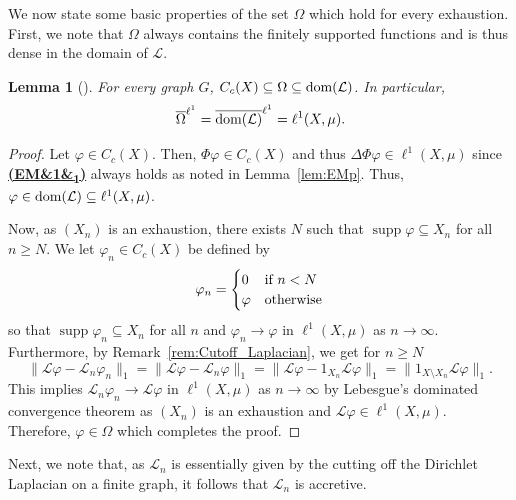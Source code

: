 \documentclass[letterpaper]{article}
\newtheorem{lemma}{Lemma}[section]
\theoremstyle{definition}
\theoremstyle{named}
\numberwithin{equation}{section}
\newcommand{\EM}[1][]{\hyperlink{ass:EM}{\textup{\textbf{(EM\ifx&#1&\else\textsubscript{#1}\fi)}}}}
\newcommand{\dom}{\textnormal{dom}} %
\newcommand{\Deltaphi}{\mathcal{L}}
\newcommand{\Lmin}{\mathcal{L}_{n}}
\begin{document}
We now state some basic properties of the set $\Omega$ which hold for every exhaustion.
First, we note that $\Omega$ always contains the finitely supported functions
and is thus dense in the domain of $\Deltaphi$.
\begin{lemma}[{\cite[Lemma~B.7]{bianchi2022generalized}}]\label{l:omega_denseness}
    For every graph $G$, $C_c(X) \subseteq \Omega \subseteq \dom(\Deltaphi)$. In particular, 
    $$\overline{\Omega}^{\ell^1} = \overline{\dom(\Deltaphi)}^{\ell^1} = \ell^1(X,\mu).$$
\end{lemma}
\begin{proof}
    Let $\varphi \in C_c(X)$. Then, $\Phi \varphi \in C_c(X)$ and thus 
    $\Delta \Phi\varphi \in \ell^1(X,\mu)$ since \EM[1] always holds as noted in
    Lemma~\ref{lem:EMp}. Thus, $\varphi \in \dom(\Deltaphi) \subseteq \ell^1(X,\mu)$.
    
    Now, as $(X_n)$ is an exhaustion, there exists $N$ such that
    $\operatorname{supp}\varphi \subseteq X_n$ for all $n \geq N$. We let $\varphi_n \in C_c(X)$
    be defined by 
    $$ \varphi_n = \begin{cases}
        0 & \textup{if } n < N \\
        \varphi & \textup{otherwise} 
    \end{cases}
    $$
    so that $\operatorname{supp}\varphi_n \subseteq X_n$ for all $n$ and $\varphi_n \to \varphi$
    in $\ell^1(X,\mu)$ as $n \to \infty$. 
    Furthermore, by Remark~\ref{rem:Cutoff_Laplacian}, we get for $n \geq N$
    $$\|\Deltaphi \varphi -\Deltaphi_n \varphi_n\|_1 = \|\Deltaphi \varphi -\Deltaphi_n \varphi\|_1 =
    \| \Deltaphi \varphi - 1_{X_n} \Deltaphi \varphi \|_1 = \|1_{X \setminus X_n} \Deltaphi \varphi\|_1.
    $$
    This implies $\Deltaphi_n \varphi_n \to \Deltaphi \varphi$ in $\ell^1(X,\mu)$
    as $n \to \infty$
    by Lebesgue's dominated convergence theorem as $(X_n)$ is an exhaustion and 
    $\Deltaphi \varphi \in \ell^1(X,\mu)$. Therefore, $\varphi \in \Omega$
    which completes the proof.
\end{proof}


Next, we note that, as $\Lmin$ is essentially given by the cutting off the Dirichlet Laplacian
on a finite graph, it follows that $\Lmin$ is accretive.
\end{document}
